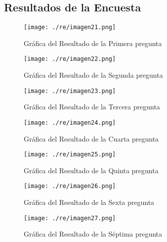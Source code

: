 \subsection{Resultados de la Encuesta}\label{section:Resultados}

\begin{figure}[H]
    \centering %
         \texttt{[image: ./re/imagen21.png]} 
    \caption{Gráfica del Resultado de la Primera pregunta \cite{GOOGLE-FORMS}}
   \label{figure:Resultado 1} %
\end{figure}
\begin{figure}[H]
    \centering %
         \texttt{[image: ./re/imagen22.png]} 
    \caption{Gráfica del Resultado de la Segunda pregunta \cite{GOOGLE-FORMS}}
   \label{figure:Resultado 2} %
\end{figure}
\begin{figure}[H]
    \centering %
         \texttt{[image: ./re/imagen23.png]} 
    \caption{Gráfica del Resultado de la Tercera pregunta \cite{GOOGLE-FORMS}}
   \label{figure:Resultado 3} %
\end{figure}
\begin{figure}[H]
    \centering %
         \texttt{[image: ./re/imagen24.png]} 
    \caption{Gráfica del Resultado de la Cuarta pregunta \cite{GOOGLE-FORMS}}
   \label{figure:Resultado 4} %
\end{figure}
\begin{figure}[H]
    \centering %
         \texttt{[image: ./re/imagen25.png]} 
    \caption{Gráfica del Resultado de la Quinta pregunta \cite{GOOGLE-FORMS}}
   \label{figure:Resultado 5} %
\end{figure}
\begin{figure}[H]
    \centering %
         \texttt{[image: ./re/imagen26.png]} 
    \caption{Gráfica del Resultado de la Sexta pregunta \cite{GOOGLE-FORMS}}
   \label{figure:Resultado 6} %
\end{figure}
\begin{figure}[H]
    \centering %
         \texttt{[image: ./re/imagen27.png]} 
    \caption{Gráfica del Resultado de la Séptima pregunta \cite{GOOGLE-FORMS}}
   \label{figure:Resultado 7} %
\end{figure}
